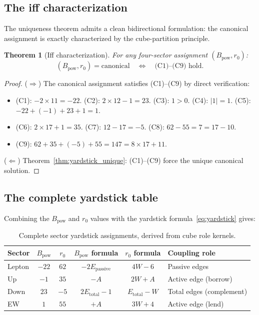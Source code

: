 \documentclass[11pt,a4paper]{article}
\newtheorem{theorem}{Theorem}[section]
\theoremstyle{definition}
\theoremstyle{remark}
\newcommand{\Epass}{E_{\mathrm{passive}}}
\newcommand{\Etot}{E_{\mathrm{total}}}
\begin{document}
\subsection{The iff characterization}

The uniqueness theorem admits a clean bidirectional formulation: the canonical
assignment is exactly characterized by the cube-partition principle.

\begin{theorem}[Iff characterization]
\label{thm:yardstick_iff}
For any four-sector assignment $(B_{\mathrm{pow}}, r_0)$:
\begin{equation}
  (B_{\mathrm{pow}}, r_0) = \text{canonical}
  \quad\Longleftrightarrow\quad
  \text{(C1)--(C9) hold.}
  \label{eq:yardstick_iff}
\end{equation}
\end{theorem}

\begin{proof}
($\Rightarrow$)\; The canonical assignment satisfies (C1)--(C9) by direct
verification:
\begin{itemize}[nosep]
  \item (C1): $-2 \times 11 = -22$.\;
  (C2): $2 \times 12 - 1 = 23$.\;
  (C3): $1 > 0$.\;
  (C4): $|1| = 1$.\;
  (C5): $-22 + (-1) + 23 + 1 = 1$.
  \item (C6): $2 \times 17 + 1 = 35$.\;
  (C7): $12 - 17 = -5$.\;
  (C8): $62 - 55 = 7 = 17 - 10$.
  \item (C9): $62 + 35 + (-5) + 55 = 147 = 8 \times 17 + 11$.
\end{itemize}

($\Leftarrow$)\; Theorem~\ref{thm:yardstick_unique}: (C1)--(C9) force the
unique canonical solution.
\end{proof}

\subsection{The complete yardstick table}

Combining the $B_{\mathrm{pow}}$ and $r_0$ values with the yardstick
formula~\eqref{eq:yardstick} gives:

\begin{table}[h]
\centering
\caption{Complete sector yardstick assignments, derived from cube role kernels.}
\label{tab:yardsticks}
\small
\begin{tabular}{@{}lccccl@{}}
\toprule
Sector & $B_{\mathrm{pow}}$ & $r_0$ & $B_{\mathrm{pow}}$ formula
  & $r_0$ formula & Coupling role \\
\midrule
Lepton & $-22$ & $62$ & $-2\Epass$ & $4W - 6$ & Passive edges \\
Up     & $-1$  & $35$ & $-A$       & $2W + A$ & Active edge (borrow) \\
Down   & $23$  & $-5$ & $2\Etot-1$ & $\Etot-W$& Total edges (complement) \\
EW     & $1$   & $55$ & $+A$       & $3W + 4$ & Active edge (lend) \\
\bottomrule
\end{tabular}
\end{table}
\end{document}
